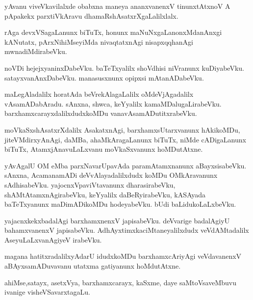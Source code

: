 \documentclass{article}
\begin{document}
\begin{mn}
yAvanu viveVkavilalxde obabxna maneya ananxvanenxV tinunxtAtxnoV A pApakekx parxtiVkAravu 
dhamaRshAsatxrXgaLalilxlalx.
\end{mn}

\begin{mn}
rAga devxVSagaLanunx biTuTx, honunx maNuNxgaLanonxMdanAnxgi kANutatx, pArxNihiMseyiMda nivaqtatxnAgi 
nisapxqqhanAgi mwnadiMdirabeVku.
\end{mn}

\begin{mn}
noVDi hejejxyaninxDabeVku. baTeTxyalilx shoVdhisi niVranunx kuDiyabeVku. satayxvanAnxDabeVku. 
manasusxnunx opipxsi mAtanADabeVku.
\end{mn}

\begin{mn}
maLegAladalilx horatAda beVrekAlagaLalilx oMdeVjAgadalilx vAsamADabAradu. sAnxna, shwca, keYyalilx 
kamaMDalugaLirabeVku. barxhamxcarayxdalilxdudxkoMDu vanavAsamADutitxrabeVku.
\end{mn}

\begin{mn}
moVkaSxshAsatxrXdalilx AsakatxnAgi, barxhamxsUtarxvanunx hAkikoMDu, jiteVMdirxyAnAgi, daMBa, 
ahaMkAragaLanunx biTuTx, niMde cADigaLanunx biTuTx, AtamxjAnavuLaLxvanu moVkaSxvanunx hoMDutAtxne.
\end{mn}

\begin{mn}
yAvAgalU OM eMba parxNavarUpavAda paramAtamxnanunx aBayxsisabeVku. sAnxna, AcamanamADi 
deVvAlayadalilxdudx koMDu OMkAravanunx sAdhisabeVku. yajocnxVpaviVtavanunx dharasirabeVku,
shAMtAtamxnAgirabeVku, keYyalilx daBeRyirabeVku, kASAyada baTeTxyanunx maDimADikoMDu hodeyabeVku. 
bUdi baLidukoLaLxbeVku.
\end{mn}

\begin{mn}
yajacnxkekxbadalAgi barxhamxnenxV japisabeVku. deVvarige badalAgiyU bahamxvanenxV japisabeVku. 
AdhAyxtimxkaciMtaneyalilxdudx veVdAMtadalilx AseyuLaLxvanAgiyeV irabeVku.
\end{mn}

\begin{mn}
magana hatitxradalilxyAdarU idudxkoMDu barxhamxcAriyAgi veVdavanenxV aBAyxsamADuvavanu utatxma 
gatiyanunx hoMdutAtxne.
\end{mn}

\begin{mn}
ahiMse,satayx, asetxVya, barxhamxcarayx, kaSxme, daye saMtoVsaveMbuvu ivanige visheVSavarxtagaLu.
\end{mn}
\end{document}
